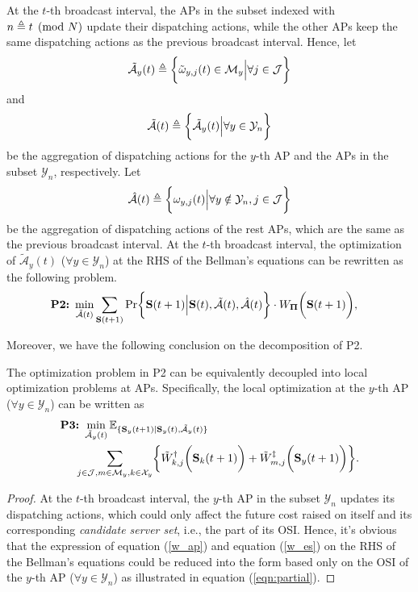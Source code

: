 At the $t$-th broadcast interval, the APs in the subset indexed with $n \triangleq t \pmod{N}$ update their dispatching actions, while the other APs keep the same dispatching actions as the previous broadcast interval.
Hence, let 
\begin{align}
    \tilde{\mathcal{A}}_{y}(t) \triangleq \bigg\{\tilde{\omega}_{y,j}(t)\in \mathcal{M}_{y} \Big| \forall j\in\mathcal{J}\bigg\}
\end{align}
and 
\begin{align}
    \tilde{\mathcal{A}}(t) \triangleq \bigg\{\tilde{\mathcal{A}}_{y}(t) \Big| \forall y\in\mathcal{Y}_{n} \bigg\}
\end{align}
be the aggregation of dispatching actions for the $y$-th AP and the APs in the subset $\mathcal{Y}_{n}$, respectively. Let
\begin{align}
    \hat{\mathcal{A}}(t) \triangleq \bigg\{\omega_{y,j}(t) \Big| \forall y\notin\mathcal{Y}_{n}, j\in\mathcal{J}\bigg\}
\end{align}
be the aggregation of dispatching actions of the rest APs, which are the same as the previous broadcast interval.
At the $t$-th broadcast interval, the optimization of $\tilde{\mathcal{A}}_{y}(t)$ ($\forall y\in\mathcal{Y}_{n}$) at the RHS of the Bellman's equations can be rewritten as the following problem.
{\small
\begin{align}
    \textbf{P2:}~
    \min_{ \tilde{\mathcal{A}}(t) }
    &\sum_{\Stat(t+1)} \Pr\Brace{
        \Stat(t+1) \Big| \Stat(t), \tilde{\mathcal{A}}(t), \hat{\mathcal{A}}(t)
    } \cdot W_{\Baseline}\Paren{\Stat(t+1)},
\end{align}
}

Moreover, we have the following conclusion on the decomposition of P2.
\begin{lemma}[]
    The optimization problem in P2 can be equivalently decoupled into local optimization problems at APs.
    Specifically, the local optimization at the $y$-th AP ($\forall y\in\mathcal{Y}_{n}$) can be written as
    \small{\begin{align}
        &\textbf{P3:}~
        \min_{ \tilde{\mathcal{A}}_{y}(t) }
        \mathbb{E}_{\set{ \Stat_{y}(t+1)|\Stat_{y}(t), \tilde{\mathcal{A}}_{y}(t) }}
        \nonumber\\
        &~~~~\sum_{ j\in\jSpace,m\in\esSet_{y},k\in\ccSet_{y} } \Brace{
            \tilde{W}^{\AP}_{k,j}\Paren{\Stat_{k}(t+1)}
            +\tilde{W}^{\ES}_{m,j}\Paren{\Stat_{y}(t+1)}
        }.
        \label{eqn:partial}
    \end{align} }
    \label{lemma:w_partial}
\end{lemma}
\begin{proof}
    At the $t$-th broadcast interval, the $y$-th AP in the subset $\mathcal{Y}_{n}$ updates its dispatching actions, which could only affect the future cost raised on itself and its corresponding \emph{candidate server set}, i.e., the part of its OSI.
    Hence, it's obvious that the expression of equation (\ref{w_ap}) and equation (\ref{w_es}) on the RHS of the Bellman's equations could be reduced into the form based only on the OSI of the $y$-th AP ($\forall y\in\mathcal{Y}_{n}$) as illustrated in equation (\ref{eqn:partial}).
\end{proof}

